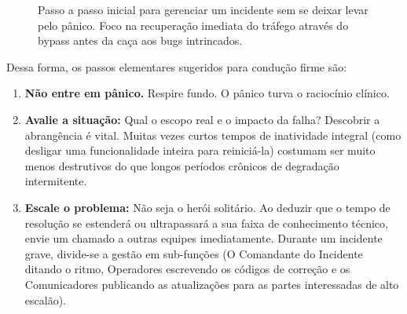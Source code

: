 \documentclass[12pt,a4paper]{report}
\begin{document}
\begin{figure}[h]
    \centering
    \caption{Passo a passo inicial para gerenciar um incidente sem se deixar levar pelo pânico. Foco na recuperação imediata do tráfego através do bypass antes da caça aos bugs intrincados.}
\end{figure}

Dessa forma, os passos elementares sugeridos para condução firme são:
\begin{enumerate}
    \item \textbf{Não entre em pânico.} Respire fundo. O pânico turva o raciocínio clínico.
    \item \textbf{Avalie a situação:} Qual o escopo real e o impacto da falha? Descobrir a abrangência é vital. Muitas vezes curtos tempos de inatividade integral (como desligar uma funcionalidade inteira para reiniciá-la) costumam ser muito menos destrutivos do que longos períodos crônicos de degradação intermitente.
    \item \textbf{Escale o problema:} Não seja o herói solitário. Ao deduzir que o tempo de resolução se estenderá ou ultrapassará a sua faixa de conhecimento técnico, envie um chamado a outras equipes imediatamente. Durante um incidente grave, divide-se a gestão em sub-funções (O Comandante do Incidente ditando o ritmo, Operadores escrevendo os códigos de correção e os Comunicadores publicando as atualizações para as partes interessadas de alto escalão).
\end{enumerate}
\end{document}
